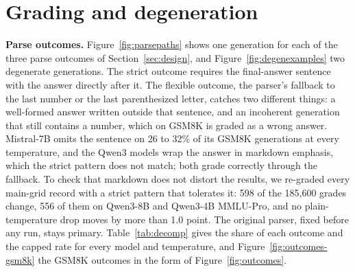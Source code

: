 \documentclass[10pt]{article}
\begin{document}
\begin{table}[t]\centering
\caption{Engine, precision, and build checks: plain-temperature accuracy at $T{=}0.7$ and
$1.3$, the drop with its 95\% item-clustered interval, the capped rate at 1.3 (\%), and the
difference of the drop from the reference Q8\_0 llama.cpp cell on the same items (positive: a
larger drop than the reference). Transf.: Hugging Face Transformers; every llama.cpp row runs a GGUF file. The BF16 llama.cpp row of Qwen3-4B belongs to the main grid.}
\label{tab:engine-full}
\scriptsize\setlength{\tabcolsep}{2.5pt}
\end{table}

\section{Grading and degeneration}
\label{app:grading}

\textbf{Parse outcomes.} Figure~\ref{fig:parsepaths} shows one generation for each of the
three parse outcomes of Section~\ref{sec:design}, and Figure~\ref{fig:degenexamples} two
degenerate generations. The strict outcome requires the final-answer sentence with the answer
directly after it. The flexible outcome, the parser's fallback to the last number or the last
parenthesized letter, catches two different things: a well-formed answer written outside that
sentence, and an incoherent generation that still contains a number, which on GSM8K is graded
as a wrong answer. Mistral-7B omits the sentence on 26 to 32\% of its GSM8K generations at
every temperature, and the Qwen3 models wrap the answer in markdown emphasis, which the strict
pattern does not match; both grade correctly through the fallback. To check that markdown does
not distort the results, we re-graded every main-grid record with a strict pattern that
tolerates it: 598 of the 185,600 grades change, 556 of them on Qwen3-8B and Qwen3-4B MMLU-Pro,
and no plain-temperature drop moves by more than 1.0 point. The original parser, fixed before
any run, stays primary. Table~\ref{tab:decomp} gives the share of each outcome and the capped
rate for every model and temperature, and Figure~\ref{fig:outcomes-gsm8k} the GSM8K outcomes
in the form of Figure~\ref{fig:outcomes}.
\end{document}
